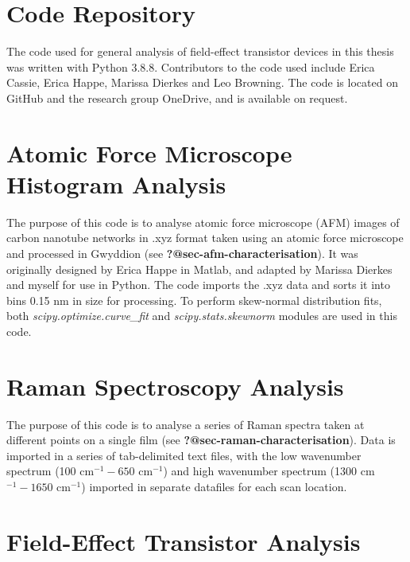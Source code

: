 \documentclass[
  a4paper,
]{scrbook}
\begin{document}
\hypertarget{code-repository}{%
\section{Code Repository}\label{code-repository}}

The code used for general analysis of field-effect transistor devices in
this thesis was written with Python 3.8.8. Contributors to the code used
include Erica Cassie, Erica Happe, Marissa Dierkes and Leo Browning. The
code is located on GitHub and the research group OneDrive, and is
available on request.

\hypertarget{sec-histogram-analysis}{%
\section{Atomic Force Microscope Histogram
Analysis}\label{sec-histogram-analysis}}

The purpose of this code is to analyse atomic force microscope (AFM)
images of carbon nanotube networks in .xyz format taken using an atomic
force microscope and processed in Gwyddion (see
\textbf{?@sec-afm-characterisation}). It was originally designed by
Erica Happe in Matlab, and adapted by Marissa Dierkes and myself for use
in Python. The code imports the .xyz data and sorts it into bins 0.15 nm
in size for processing. To perform skew-normal distribution fits, both
\emph{scipy.optimize.curve\_fit} and \emph{scipy.stats.skewnorm} modules
are used in this code.

\hypertarget{sec-raman-analysis}{%
\section{Raman Spectroscopy Analysis}\label{sec-raman-analysis}}

The purpose of this code is to analyse a series of Raman spectra taken
at different points on a single film (see
\textbf{?@sec-raman-characterisation}). Data is imported in a series of
tab-delimited text files, with the low wavenumber spectrum (100
cm\(^{-1} - 650\) cm\(^{-1}\)) and high wavenumber spectrum (1300
cm\(^{-1} - 1650\) cm\(^{-1}\)) imported in separate datafiles for each
scan location.

\hypertarget{sec-field-effect-transistor-analysis}{%
\section{Field-Effect Transistor
Analysis}\label{sec-field-effect-transistor-analysis}}
\end{document}
